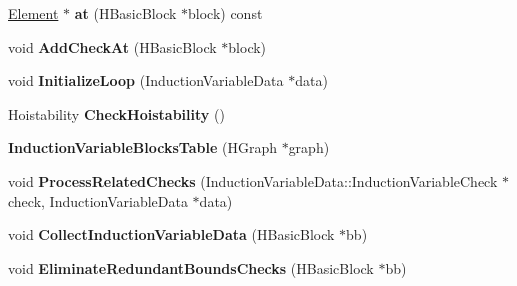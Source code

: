 \begin{DoxyCompactItemize}
\item 
\hypertarget{classv8_1_1internal_1_1_b_a_s_e___e_m_b_e_d_d_e_d_a29356f86fee9ea6235f75eb6220fcc75}{}\hyperlink{classv8_1_1internal_1_1_b_a_s_e___e_m_b_e_d_d_e_d_1_1_element}{Element} $\ast$ {\bfseries at} (H\+Basic\+Block $\ast$block) const \label{classv8_1_1internal_1_1_b_a_s_e___e_m_b_e_d_d_e_d_a29356f86fee9ea6235f75eb6220fcc75}

\item 
\hypertarget{classv8_1_1internal_1_1_b_a_s_e___e_m_b_e_d_d_e_d_a4676c72160ffffdd607d34067965cebf}{}void {\bfseries Add\+Check\+At} (H\+Basic\+Block $\ast$block)\label{classv8_1_1internal_1_1_b_a_s_e___e_m_b_e_d_d_e_d_a4676c72160ffffdd607d34067965cebf}

\item 
\hypertarget{classv8_1_1internal_1_1_b_a_s_e___e_m_b_e_d_d_e_d_ab8a3ee34ac37e21fa1211d735db176d5}{}void {\bfseries Initialize\+Loop} (Induction\+Variable\+Data $\ast$data)\label{classv8_1_1internal_1_1_b_a_s_e___e_m_b_e_d_d_e_d_ab8a3ee34ac37e21fa1211d735db176d5}

\item 
\hypertarget{classv8_1_1internal_1_1_b_a_s_e___e_m_b_e_d_d_e_d_a738c5dd071c5ee4cba1b168240a8a5e5}{}Hoistability {\bfseries Check\+Hoistability} ()\label{classv8_1_1internal_1_1_b_a_s_e___e_m_b_e_d_d_e_d_a738c5dd071c5ee4cba1b168240a8a5e5}

\item 
\hypertarget{classv8_1_1internal_1_1_b_a_s_e___e_m_b_e_d_d_e_d_a3d0287a2407cdc343ddc4c486a888abe}{}{\bfseries Induction\+Variable\+Blocks\+Table} (H\+Graph $\ast$graph)\label{classv8_1_1internal_1_1_b_a_s_e___e_m_b_e_d_d_e_d_a3d0287a2407cdc343ddc4c486a888abe}

\item 
\hypertarget{classv8_1_1internal_1_1_b_a_s_e___e_m_b_e_d_d_e_d_aba0babac77e7a97f3760d2df89114413}{}void {\bfseries Process\+Related\+Checks} (Induction\+Variable\+Data\+::\+Induction\+Variable\+Check $\ast$check, Induction\+Variable\+Data $\ast$data)\label{classv8_1_1internal_1_1_b_a_s_e___e_m_b_e_d_d_e_d_aba0babac77e7a97f3760d2df89114413}

\item 
\hypertarget{classv8_1_1internal_1_1_b_a_s_e___e_m_b_e_d_d_e_d_ac7ed98f5ce8b4d46a2b998c6d0b36192}{}void {\bfseries Collect\+Induction\+Variable\+Data} (H\+Basic\+Block $\ast$bb)\label{classv8_1_1internal_1_1_b_a_s_e___e_m_b_e_d_d_e_d_ac7ed98f5ce8b4d46a2b998c6d0b36192}

\item 
\hypertarget{classv8_1_1internal_1_1_b_a_s_e___e_m_b_e_d_d_e_d_aef915f6866821857cf4d75e5fce5c295}{}void {\bfseries Eliminate\+Redundant\+Bounds\+Checks} (H\+Basic\+Block $\ast$bb)\label{classv8_1_1internal_1_1_b_a_s_e___e_m_b_e_d_d_e_d_aef915f6866821857cf4d75e5fce5c295}


\end{DoxyCompactItemize}
